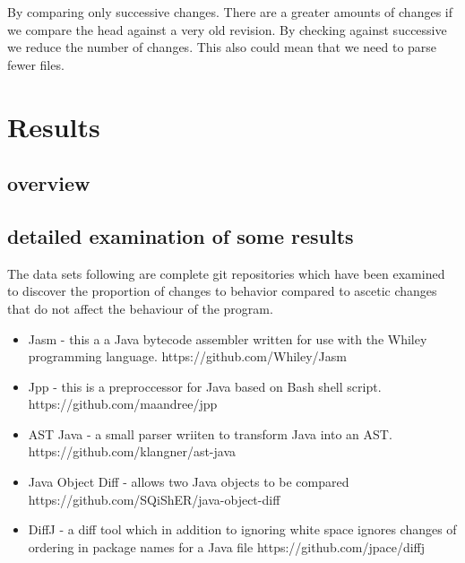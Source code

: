 By comparing only successive changes.
  There are a greater amounts of changes if we compare the head against a very old revision. By checking against successive we reduce the number of changes. This also could mean that we need to parse fewer files.


\section{Results}
\subsection{overview}
\subsection{detailed examination of some results}

The data sets following are complete git repositories which have been examined to discover the proportion of changes to behavior compared to ascetic changes that do not affect the behaviour of the program. 

% 
% 

\begin{itemize}
  \item Jasm - this a a Java bytecode assembler written for use with the Whiley programming language. https://github.com/Whiley/Jasm
  \item Jpp - this is a preproccessor for Java based on Bash shell script. https://github.com/maandree/jpp
  \item AST Java - a small parser wriiten to transform Java into an AST. https://github.com/klangner/ast-java
  \item Java Object Diff - allows two Java objects to be compared https://github.com/SQiShER/java-object-diff
  \item DiffJ - a diff tool which in addition to ignoring white space ignores changes of ordering in package names for a Java file https://github.com/jpace/diffj
\end{itemize}


